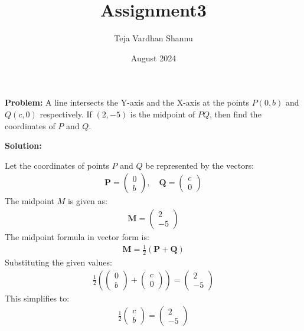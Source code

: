 \documentclass[journal]{IEEEtran}
\title{Assignment3}
\author{Teja Vardhan Shannu}
\date{August 2024}
\numberwithin{equation}{enumi}
\numberwithin{figure}{enumi}
\begin{document}
\maketitle
\textbf{Problem:} A line intersects the Y-axis and the X-axis at the points $P(0,b)$ and $Q(c,0)$ respectively. If $(2,-5)$ is the midpoint of $PQ$, then find the coordinates of $P$ and $Q$.

\textbf{Solution:}

Let the coordinates of points $P$ and $Q$ be represented by the vectors:
\begin{align}
	\mathbf{P} = \begin{pmatrix} 0 \\ b \end{pmatrix}, \quad \mathbf{Q} = \begin{pmatrix} c \\ 0 \end{pmatrix}
\end{align}
The midpoint $M$ is given as:
\begin{align}
       \mathbf{M} = \begin{pmatrix} 2 \\ -5 \end{pmatrix}
\end{align}	
The midpoint formula in vector form is:
\begin{align}
       \mathbf{M} = \frac{1}{2} (\mathbf{P} + \mathbf{Q})
\end{align}
Substituting the given values:
\begin{align}
       \frac{1}{2} \left(\begin{pmatrix} 0 \\ b \end{pmatrix} + \begin{pmatrix} c \\ 0 \end{pmatrix}\right) = \begin{pmatrix} 2 \\ -5 \end{pmatrix}
\end{align}
This simplifies to:
\begin{align}
       \frac{1}{2} \begin{pmatrix} c \\ b \end{pmatrix} = \begin{pmatrix} 2 \\ -5 \end{pmatrix}
\end{align}
\end{document}
